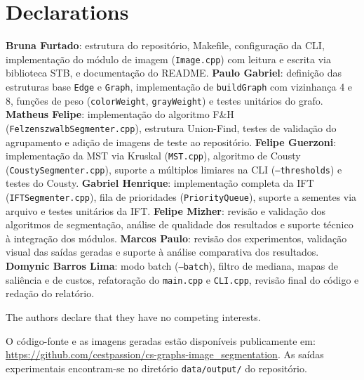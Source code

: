 \documentclass{sbc2023}
\begin{document}
\section*{Declarations}

\begin{contributions}
\textbf{Bruna Furtado}: estrutura do repositório, Makefile, configuração da CLI,
implementação do módulo de imagem (\texttt{Image.cpp}) com leitura e escrita via
biblioteca STB, e documentação do README.
\textbf{Paulo Gabriel}: definição das estruturas base \texttt{Edge} e
\texttt{Graph}, implementação de \texttt{buildGraph} com vizinhança 4 e 8,
funções de peso (\texttt{colorWeight}, \texttt{grayWeight}) e testes unitários
do grafo.
\textbf{Matheus Felipe}: implementação do algoritmo F\&H
(\texttt{FelzenszwalbSegmenter.cpp}), estrutura Union-Find, testes de validação
do agrupamento e adição de imagens de teste ao repositório.
\textbf{Felipe Guerzoni}: implementação da MST via Kruskal (\texttt{MST.cpp}),
algoritmo de Cousty (\texttt{CoustySegmenter.cpp}), suporte a múltiplos limiares
na CLI (\texttt{--thresholds}) e testes do Cousty.
\textbf{Gabriel Henrique}: implementação completa da IFT
(\texttt{IFTSegmenter.cpp}), fila de prioridades (\texttt{PriorityQueue}),
suporte a sementes via arquivo e testes unitários da IFT.
\textbf{Felipe Mizher}: revisão e validação dos algoritmos de segmentação,
análise de qualidade dos resultados e suporte técnico à integração dos módulos.
\textbf{Marcos Paulo}: revisão dos experimentos, validação visual das saídas
geradas e suporte à análise comparativa dos resultados.
\textbf{Domynic Barros Lima}: modo batch (\texttt{--batch}), filtro de mediana,
mapas de saliência e de custos, refatoração do \texttt{main.cpp} e
\texttt{CLI.cpp}, revisão final do código e redação do relatório.
\end{contributions}

\begin{interests}
The authors declare that they have no competing interests.
\end{interests}

\begin{materials}
O código-fonte e as imagens geradas estão disponíveis publicamente em:
\url{https://github.com/cestpassion/cs-graphs-image_segmentation}.
As saídas experimentais encontram-se no diretório \texttt{data/output/} do repositório.
\end{materials}



\end{document}
